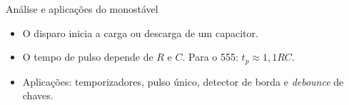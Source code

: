 \begin{frame}{Análise e aplicações do monostável}
\begin{itemize}
\item O disparo inicia a carga ou descarga de um capacitor.
\item O tempo de pulso depende de \(R\) e \(C\). Para o 555: \(t_p\approx1{,}1RC\).
\item Aplicações: temporizadores, pulso único, detector de borda e \textit{debounce} de chaves.
\end{itemize}
\end{frame}